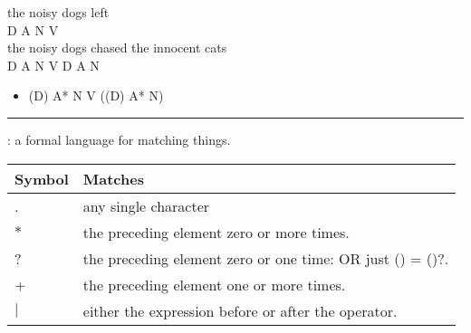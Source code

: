 \documentclass[a4paper,landscape,headrule,footrule]{foils}
\begin{document}
\begin{exe}
  \ex \gll the noisy dogs left \\
  D A N V \\
  \ex  \gll the noisy dogs chased the innocent cats \\
 D A N V D A N \\
\end{exe}
\begin{itemize}
\item (D) A* N V ((D) A* N)
\end{itemize}
\hrule
{}: a formal language for matching things.
\\[2ex]
 \begin{tabular}{ll}
    Symbol & Matches \\ \hline
    . & any single character\\
    $*$ &	the preceding element zero or more times. \\
    ? &	 the preceding element zero or one time: OR just () = ()?. \\
    + &	 the preceding element one or more times. \\
    $|$ &  either the expression before or after the operator. \\
  \end{tabular}










\end{document}
